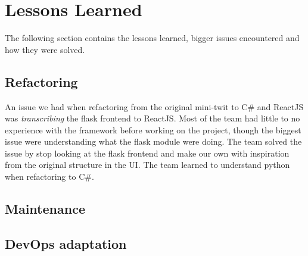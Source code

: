 \section{Lessons Learned}
\label{sec:lessons_learned}
The following section contains the lessons learned, bigger issues encountered and how they were solved.
\subsection{Refactoring}
An issue we had when refactoring from the original mini-twit to C\# and ReactJS was \textit{transcribing} the flask frontend to ReactJS. Most of the team had little to no experience with the framework before working on the project, though the biggest issue were understanding what the flask module were doing. The team solved the issue by stop looking at the flask frontend and make our own with inspiration from the original structure in the UI. The team learned to understand python when refactoring to C\#. 


\subsection{Maintenance}


\subsection{DevOps adaptation}
